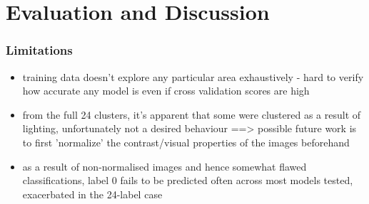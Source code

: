 \chapter{Evaluation and Discussion} \label{chap:evaluation}

\subsection{Limitations}

\begin{itemize}
    \item training data doesn't explore any particular area exhaustively - hard to verify how accurate any model is even if cross validation scores are high
    \item from the full 24 clusters, it's apparent that some were clustered as a result of lighting, unfortunately not a desired behaviour ==> possible future work is to first 'normalize' the contrast/visual properties of the images beforehand 
    \item as a result of non-normalised images and hence somewhat flawed classifications, label 0 fails to be predicted often across most models tested, exacerbated in the 24-label case
\end{itemize}
